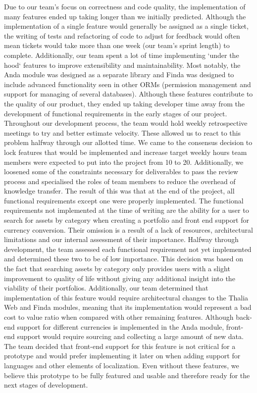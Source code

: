 \documentclass[main.tex]{subfiles}
\begin{document}
Due to our team's focus on correctness and code quality, the implementation of many features ended up taking longer than we initially predicted. Although the implementation of a single feature would generally be assigned as a single ticket, the writing of tests and refactoring of code to adjust for feedback would often mean tickets would take more than one week (our team's sprint length) to complete. Additionally, our team spent a lot of time implementing `under the hood` features to improve extensibility and maintainability. Most notably, the Anda module was designed as a separate library and Finda was designed to include advanced functionality seen in other ORMs (permission management and support for managing of several databases). Although these features contribute to the quality of our product, they ended up taking developer time away from the development of functional requirements in the early stages of our project.
Throughout our development process, the team would hold weekly retrospective meetings to try and better estimate velocity. These allowed us to react to this problem halfway through our allotted time. We came to the consensus decision to lock features that would be implemented and increase target weekly hours team members were expected to put into the project from 10 to 20. Additionally, we loosened some of the constraints necessary for deliverables to pass the review process and specialised the roles of team members to reduce the overhead of knowledge transfer. The result of this was that at the end of the project, all functional requirements except one were properly implemented.
The functional requirements not implemented at the time of writing are the ability for a user to search for assets by category when creating a portfolio and front end support for currency conversion. Their omission is a result of a lack of resources, architectural limitations and our internal assessment of their importance. Halfway through development, the team assessed each functional requirement not yet implemented and determined these two to be of low importance. This decision was based on the fact that searching assets by category only provides users with a slight improvement to quality of life without giving any additional insight into the viability of their portfolios. Additionally, our team determined that implementation of this feature would require architectural changes to the Thalia Web and Finda modules, meaning that its implementation would represent a bad cost to value ratio when compared with other remaining features. Although back-end support for different currencies is implemented in the Anda module, front-end support would require sourcing and collecting a large amount of new data. The team decided that front-end support for this feature is not critical for a prototype and would prefer implementing it later on when adding support for languages and other elements of localization. Even without these features, we believe this prototype to be fully featured and usable and therefore ready for the next stages of development.
\end{document}
